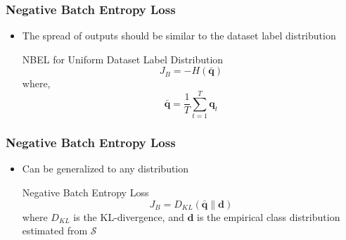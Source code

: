 \begin{frame}
	\frametitle{Negative Batch Entropy Loss}
	\begin{itemize}
		\item The spread of outputs should be similar to the dataset
			label distribution
			\begin{block}{NBEL for Uniform Dataset Label Distribution}
				\begin{equation*}
					J_B = -H(\bar{\mathbf{q}})
				\end{equation*}
				where,
				\begin{equation*}
					\bar{\mathbf{q}} = \frac{1}{T}\sum_{t=1}^{T}\mathbf{q}_t
				\end{equation*}
			\end{block}

	\end{itemize}
\end{frame}

\begin{frame}
	\frametitle{Negative Batch Entropy Loss}
	\begin{itemize}
		\item Can be generalized to any distribution
			\begin{block}{Negative Batch Entropy Loss}
				\begin{equation*}
					\label{eq:nbel}
					J_B = D_{KL} (\bar{\mathbf{q}} \lVert \mathbf{d})
				\end{equation*}
				where $D_{KL}$ is the KL-divergence, and $\mathbf{d}$ is
				the empirical class distribution estimated from $\mathcal{S}$
			\end{block}

	\end{itemize}
\end{frame}

